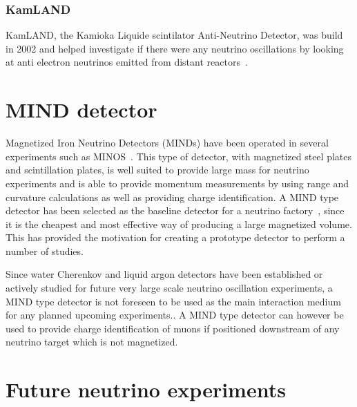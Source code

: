 \subsubsection{KamLAND}
KamLAND, the Kamioka Liquide scintilator Anti-Neutrino Detector, was build in 2002 and helped investigate if there were any neutrino oscillations by looking at anti electron neutrinos emitted from distant reactors~\cite{46KamLAND}.


\section{MIND detector}\label{subsec:MINDdetector}
Magnetized Iron Neutrino Detectors (MINDs) have been operated in several experiments such as MINOS~\cite{MINOS}.
This type of detector, with magnetized steel plates and scintillation plates, is well suited to provide large mass for neutrino experiments and is able to provide momentum measurements by using range and curvature calculations as well as providing charge identification. A MIND type detector has been selected as the baseline detector for a neutrino factory~\cite{ISS, 27Bross}, since it is the cheapest and most effective way of producing a large magnetized volume. This has provided the motivation for creating a prototype detector to perform a number of studies.

Since water Cherenkov and liquid argon detectors have been established or actively studied for future very large scale neutrino oscillation experiments, a MIND type detector is not foreseen to be used as the main interaction medium for any planned upcoming experiments.. A MIND type detector can however be used to provide charge identification of muons if positioned downstream of any neutrino target which is not magnetized.

\section{Future neutrino experiments}

